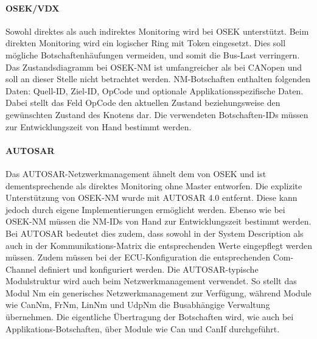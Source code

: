 \documentclass[
  a4paper,					    %
  twoside,
  DIV=calc,     				%
  bibliography=totoc,
  cleardoublepage=empty,
  ngerman,     					%
  final       					%
]{scrbook}
\begin{document}
\paragraph{OSEK/VDX}
Sowohl direktes als auch indirektes Monitoring wird bei OSEK unterstützt. Beim direkten Monitoring wird ein logischer Ring mit Token eingesetzt. Dies soll mögliche Botschaftenhäufungen vermeiden, und somit die Bus-Last verringern. Das Zustandsdiagramm bei OSEK-NM ist umfangreicher als bei CANopen und soll an dieser Stelle nicht betrachtet werden. NM-Botschaften enthalten folgenden Daten: Quell-ID, Ziel-ID, OpCode und optionale Applikationsspezifische Daten. Dabei stellt das Feld OpCode den aktuellen Zustand beziehungsweise den gewünschten Zustand des Knotens dar. Die verwendeten Botschaften-IDs müssen zur Entwicklungszeit von Hand bestimmt werden.\cite{nm_osek}\cite{ZimmermannSchmidgall201011}

\paragraph{AUTOSAR}
Das AUTOSAR-Netzwerkmanagement ähnelt dem von OSEK und ist dementsprechende als direktes Monitoring ohne Master entworfen. Die explizite Unterstützung von OSEK-NM wurde mit AUTOSAR 4.0 entfernt. Diese kann jedoch durch eigene Implementierungen ermöglicht werden. Ebenso wie bei OSEK-NM müssen die NM-IDs von Hand zur Entwicklungszeit bestimmt werden. Bei AUTOSAR bedeutet dies zudem, dass sowohl in der System Description als auch in der Kommunikations-Matrix die entsprechenden Werte eingepflegt werden müssen. Zudem müssen bei der ECU-Kon\-fi\-gu\-ra\-tion die entsprechenden Com-Channel definiert und konfiguriert werden. Die AUTOSAR-typische Modulstruktur wird auch beim Netzwerkmanagement verwendet. So stellt das Modul Nm ein generisches Netzwerkmanagement zur Verfügung, während Module wie CanNm, FrNm, LinNm und UdpNm die Busabhängige Verwaltung übernehmen. Die eigentliche Übertragung der Botschaften wird, wie auch bei Applikations-Botschaften, über Module wie Can und CanIf durchgeführt.\cite{nm_fr}\cite{ZimmermannSchmidgall201011}



\end{document}
